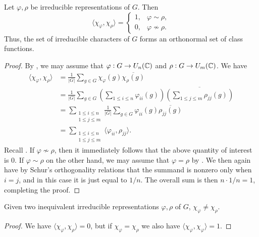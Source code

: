 		\begin{ftheo}
			\label{theo: inner product of irreducible characters}
			Let $\varphi,\rho$ be irreducible representations of $G$. Then
			\[ \langle \chi_\varphi , \chi_\rho \rangle = \begin{cases} 1 , & \varphi \sim \rho, \\ 0 , & \varphi \not\sim \rho. \end{cases} \]
			Thus, the set of irreducible characters of $G$ forms an orthonormal set of class functions.
		\end{ftheo}
		\begin{proof}
			By , we may assume that $\varphi : G \to U_n(\mathbb{C})$ and $\rho : G \to U_m(\mathbb{C})$. We have
			\begin{align*}
				\langle \chi_\varphi , \chi_\rho \rangle &= \frac{1}{|G|} \sum_{g \in G} \chi_\varphi(g) \overline{\chi_\rho(g)} \\
					&= \frac{1}{|G|} \sum_{g \in G} \left(\sum_{1 \le i \le n} \varphi_{ii}(g)\right) \overline{\left( \sum_{1 \le j \le m} \rho_{jj}(g) \right)} \\
					&= \sum_{\substack{1 \le i \le n \\ 1 \le j \le m}} \frac{1}{|G|} \sum_{g \in G} \varphi_{ii}(g) \overline{\rho_{jj}(g)} \\
					&= \sum_{\substack{1 \le i \le n \\ 1 \le j \le m}} \langle \varphi_{ii} , \rho_{jj} \rangle.
			\end{align*}
			Recall . If $\varphi \not\sim \rho$, then it immediately follows that the above quantity of interest is $0$. If $\varphi \sim \rho$ on the other hand, we may assume that $\varphi = \rho$ by . We then again have by Schur's orthogonality relations that the summand is nonzero only when $i = j$, and in this case it is just equal to $1/n$. The overall sum is then $n \cdot 1/n = 1$, completing the proof.
		\end{proof}

		\begin{fcor}
			Given two inequivalent irreducible representations $\varphi , \rho$ of $G$, $\chi_{\varphi} \ne \chi_{\rho}$.
		\end{fcor}
		\begin{proof}
			We have $\langle \chi_\varphi , \chi_\rho \rangle = 0$, but if $\chi_\varphi = \chi_\rho$ we also have $\langle \chi_\varphi , \chi_\varphi \rangle = 1$.
		\end{proof}

